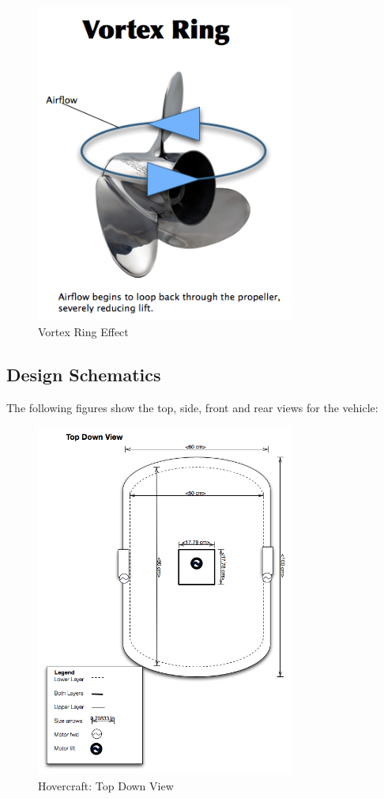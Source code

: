 \begin{figure}[h]
  \begin{center}
    \includegraphics[width=85mm]{imageSources/vortexRing.png}
  \end{center}
  \caption{Vortex Ring Effect} 
  \label{vortexRing}
\end{figure}

\subsection{Design Schematics}

The following figures show the top, side, front and rear views for the vehicle:

\begin{figure}[h]
  \begin{center}
    \includegraphics[width=85mm]{imageSources/topDownView.png}
  \end{center}
  \caption{Hovercraft: Top Down View} 
  \label{topDownView}
\end{figure}

